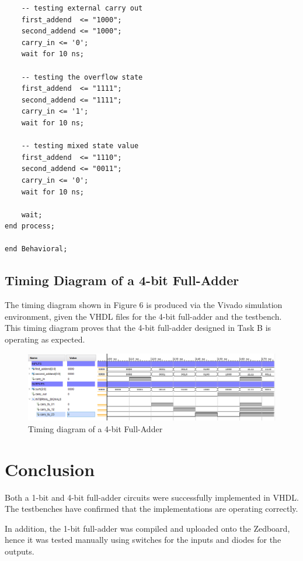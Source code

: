 \documentclass[11pt]{article}
\begin{document}
\newpage
\begin{verbatim}
    -- testing external carry out
    first_addend  <= "1000";
    second_addend <= "1000";
    carry_in <= '0';
    wait for 10 ns;
    
    -- testing the overflow state
    first_addend  <= "1111";
    second_addend <= "1111";
    carry_in <= '1';
    wait for 10 ns;
    
    -- testing mixed state value
    first_addend  <= "1110";
    second_addend <= "0011";
    carry_in <= '0';
    wait for 10 ns;
    
    wait;
end process;

end Behavioral;
\end{verbatim}


\subsection{Timing Diagram of a 4-bit Full-Adder}
The timing diagram shown in Figure 6 is produced via the Vivado simulation environment, given the VHDL files for the 4-bit full-adder and the testbench. This timing diagram proves that the 4-bit full-adder designed in Task B is operating as expected.
\hspace{20mm}

\begin{figure}[ht]
    \centering
    \includegraphics[width=1.0 \textwidth]{simulation.png}
    \caption{Timing diagram of a 4-bit Full-Adder}
    \label{fig:isa}
\end{figure}


\section {Conclusion}

Both a 1-bit and 4-bit full-adder circuits were successfully implemented in VHDL. The testbenches have confirmed that the implementations are operating correctly. 

In addition, the 1-bit full-adder was compiled and uploaded onto the Zedboard, hence it was tested manually using switches for the inputs and diodes for the outputs.
\end{document}
